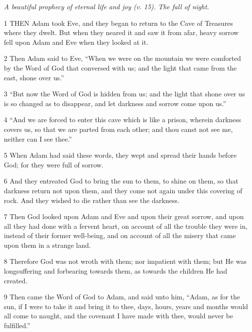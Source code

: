 \par \textit{A beautiful prophecy of eternal life and joy (v. 15). The fall of night.}

\par 1 THEN Adam took Eve, and they began to return to the Cave of Treasures where they dwelt. But when they neared it and saw it from afar, heavy sorrow fell upon Adam and Eve when they looked at it.

\par 2 Then Adam said to Eve, “When we were on the mountain we were comforted by the Word of God that conversed with us; and the light that came from the east, shone over us.”

\par 3 “But now the Word of God is hidden from us; and the light that shone over us is so changed as to disappear, and let darkness and sorrow come upon us.”

\par 4 “And we are forced to enter this cave which is like a prison, wherein darkness covers us, so that we are parted from each other; and thou canst not see me, neither can I see thee.”

\par 5 When Adam had said these words, they wept and spread their hands before God; for they were full of sorrow.

\par 6 And they entreated God to bring the sun to them, to shine on them, so that darkness return not upon them, and they come not again under this covering of rock. And they wished to die rather than see the darkness.

\par 7 Then God looked upon Adam and Eve and upon their great sorrow, and upon all they had done with a fervent heart, on account of all the trouble they were in, instead of their former well-being, and on account of all the misery that came upon them in a strange land.

\par 8 Therefore God was not wroth with them; nor impatient with them; but He was longsuffering and forbearing towards them, as towards the children He had created.

\par 9 Then came the Word of God to Adam, and said unto him, “Adam, as for the sun, if I were to take it and bring it to thee, days, hours, years and months would all come to naught, and the covenant I have made with thee, would never be fulfilled.”

